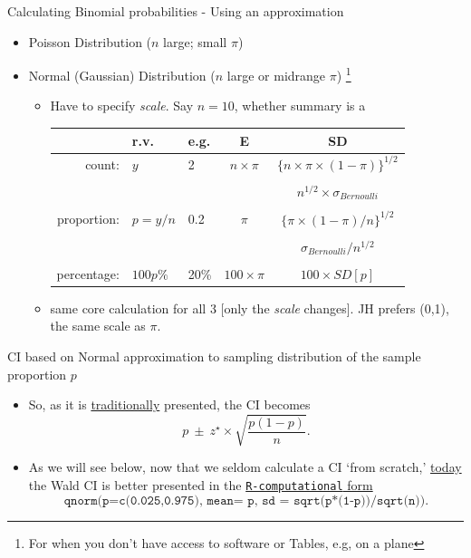 \documentclass{beamer}\usepackage[]{graphicx}\usepackage[]{color}
\begin{document}
\begin{frame}{Calculating Binomial probabilities - Using an approximation}

\small
\begin{itemize}
	\item Poisson Distribution ($n$ large;  small $\pi$)
	\item Normal (Gaussian) Distribution ($n$ large or midrange $\pi $) \footnote{\footnotesize
		For when you don't have access to software or Tables, e.g, on a plane} 
	\begin{itemize}
		\item Have to specify \textit{scale}. Say $n=10$, whether summary is a 
		\begin{tabular}{rllcc}
			&  \textbf{r.v. }        &  \textbf{e.g.} & \textbf{E} & \textbf{SD} \\ 
			\hline
			count:          &  $y$        &  2 & $n \times \pi$ & $\{n \times \pi \times (1-\pi) \}^{1/2}$ \\
			& & & & \\
			& & & & $n^{1/2} \times \sigma_{Bernoulli}$ \\
			
			& & & & \\
			proportion:   & $p=y/n$  & 0.2 & $ \pi$ & $\{\pi \times (1-\pi) / n \}^{1/2}$ \\
			& & & & \\
			
			& & & &  $\sigma_{Bernoulli} / n^{1/2}$\\
			
			& & & & \\
			percentage: &$100p\%$ & 20\% & $100 \times \pi$ & $100 \times SD[p]$ \\
			\hline
		\end{tabular}
		\item same core calculation for all 3 [only the \textit{scale} changes]. JH prefers (0,1), the same scale as $\pi.$
		
	\end{itemize}
	
\end{itemize}

\end{frame}


\begin{frame}{CI based on Normal approximation to sampling distribution of the sample proportion $p$}
\small
\begin{itemize}
	\item So, as it is \underline{traditionally} presented,  the CI becomes
	$$p \  \pm  \ z^\star \times \sqrt{\frac{p(1-p)}{n}}.$$ \pause 
	\item As we will see below, now that we seldom calculate a CI `from scratch,'  \underline{today} the Wald CI is better presented in the \underline{\texttt{R-computational} form}
	\scriptsize{$$\texttt{qnorm(p=c(0.025,0.975),  mean= p,  sd = sqrt(p*(1-p))/sqrt(n))}.$$}
\end{itemize}
\end{frame}
\end{document}
